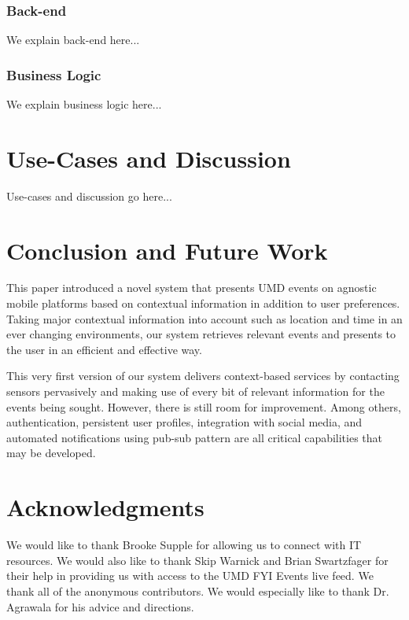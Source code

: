 \documentclass{acm_proc_article-sp}
\begin{document}
\subsubsection{Back-end}
We explain back-end here...

\subsubsection{Business Logic}
We explain business logic here...

\section{Use-Cases and Discussion}
Use-cases and discussion go here...

\section{Conclusion and Future Work}
This paper introduced a novel system that presents UMD events on agnostic mobile platforms based on contextual information in addition to user preferences. Taking major contextual information into account such as location and time in an ever changing environments, our system retrieves relevant events and presents to the user in an efficient and effective way.

This very first version of our system delivers context-based services by contacting sensors pervasively and making use of every bit of relevant information for the events being sought. However, there is still room for improvement. Among others, authentication, persistent user profiles, integration with social media, and automated notifications using pub-sub pattern are all critical capabilities that may be developed.  

\section{Acknowledgments}
We would like to thank Brooke Supple for allowing us to connect with IT resources. We would also like to thank Skip Warnick and Brian Swartzfage​r for their help in providing us with access to the UMD FYI Events live feed. We thank all of the anonymous contributors. We would especially like to thank Dr. Agrawala for his advice and directions.

%

%
%
\balancecolumns
\end{document}
